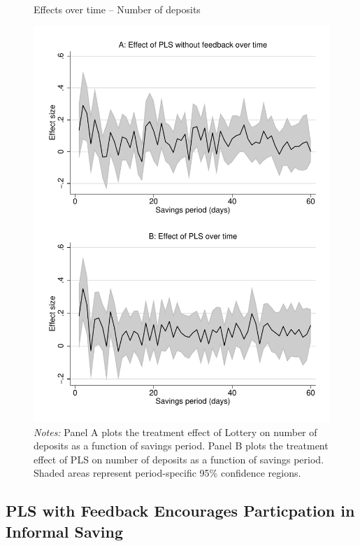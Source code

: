 \documentclass[11pt]{article}
\begin{document}
		\begin{figure}[ht]
		\caption{Effects over time -- Number of deposits}
		\includegraphics[width=\textwidth]{../../figures/line-timemobile_deposits.pdf}
		\caption*{\footnotesize \emph{Notes:} Panel A plots the treatment effect of Lottery on number of deposits as a function of savings period. Panel B plots the treatment effect of PLS on number of deposits as a function of savings period. Shaded areas represent period-specific 95\% confidence regions.}
		\end{figure}

	\subsection{PLS with Feedback Encourages Particpation in Informal Saving}
\end{document}
